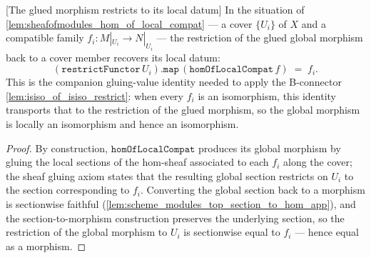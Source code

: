 \begin{lemma}




[The glued morphism restricts to its local datum]
  \label{lem:hom_of_local_compat_restrict}
  In the situation of \cref{lem:sheafofmodules_hom_of_local_compat} --- a cover \(\{U_i\}\)
  of \(X\) and a compatible family \(f_i : M|_{U_i} \to N|_{U_i}\) --- the restriction of the
  glued global morphism back to a cover member recovers its local datum:
  \[
    (\mathtt{restrictFunctor}\,U_i).\mathtt{map}\,(\mathtt{homOfLocalCompat}\,f) \;=\; f_i .
  \]
  This is the companion gluing-value identity needed to apply the B-connector
  \cref{lem:isiso_of_isiso_restrict}: when every \(f_i\) is an isomorphism, this identity
  transports that to the restriction of the glued morphism, so the global morphism is
  locally an isomorphism and hence an isomorphism.
\end{lemma}
\begin{proof}



  By construction, \(\mathtt{homOfLocalCompat}\) produces its global morphism by gluing
  the local sections of the hom-sheaf associated to each \(f_i\) along the cover; the sheaf
  gluing axiom states that the resulting global section restricts on \(U_i\) to the section
  corresponding to \(f_i\). Converting the global section back to a morphism is sectionwise
  faithful (\cref{lem:scheme_modules_top_section_to_hom_app}), and the section-to-morphism
  construction preserves the underlying section, so the restriction of the global morphism to
  \(U_i\) is sectionwise equal to \(f_i\) --- hence equal as a morphism.
\end{proof}

